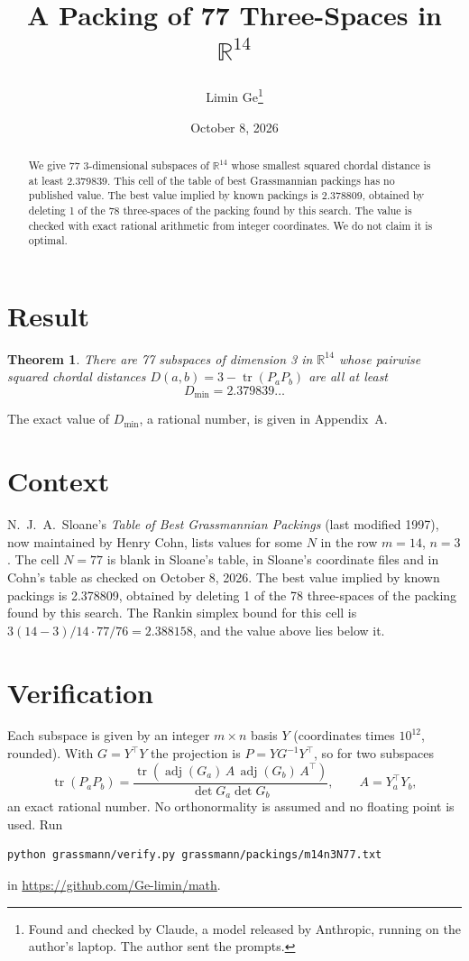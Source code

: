 \documentclass[11pt,a4paper]{article}
\title{A Packing of 77 Three-Spaces in $\mathbb{R}^{14}$}
\author{Limin Ge\thanks{Found and checked by Claude, a model released by Anthropic, running on the author's laptop. The author sent the prompts.}}
\date{October 8, 2026}
\newtheorem*{theorem}{Theorem}
\begin{document}
\maketitle
\begin{abstract}
We give 77 3-dimensional subspaces of $\mathbb{R}^{14}$ whose smallest squared chordal distance is at least 2.379839. This cell of the table of best Grassmannian packings has no published value. The best value implied by known packings is 2.378809, obtained by deleting 1 of the 78 three-spaces of the packing found by this search. The value is checked with exact rational arithmetic from integer coordinates. We do not claim it is optimal.
\end{abstract}

\section{Result}
\begin{theorem}
There are 77 subspaces of dimension 3 in $\mathbb{R}^{14}$ whose pairwise squared chordal distances $D(a,b) = 3 - \operatorname{tr}(P_aP_b)$ are all at least
\[ D_{\min} = 2.379839\ldots \]
\end{theorem}
The exact value of $D_{\min}$, a rational number, is given in Appendix~A.


\section{Context}
N.~J.~A.~Sloane's \emph{Table of Best Grassmannian Packings} (last modified 1997), now maintained by Henry Cohn, lists values for some $N$ in the row $m=14$, $n=3$. The cell $N=77$ is blank in Sloane's table, in Sloane's coordinate files and in Cohn's table as checked on October 8, 2026. The best value implied by known packings is 2.378809, obtained by deleting 1 of the 78 three-spaces of the packing found by this search. The Rankin simplex bound for this cell is $3(14-3)/14\cdot 77/76 = 2.388158$, and the value above lies below it.


\section{Verification}
Each subspace is given by an integer $m\times n$ basis $Y$ (coordinates times $10^{12}$, rounded). With $G=Y^\top Y$ the projection is $P=YG^{-1}Y^\top$, so for two subspaces
\[ \operatorname{tr}(P_aP_b)=\frac{\operatorname{tr}(\operatorname{adj}(G_a)\,A\,\operatorname{adj}(G_b)\,A^\top)}{\det G_a\det G_b},\qquad A=Y_a^\top Y_b, \]
an exact rational number. No orthonormality is assumed and no floating point is used. Run
\begin{verbatim}
python grassmann/verify.py grassmann/packings/m14n3N77.txt
\end{verbatim}
in \url{https://github.com/Ge-limin/math}.
\end{document}
